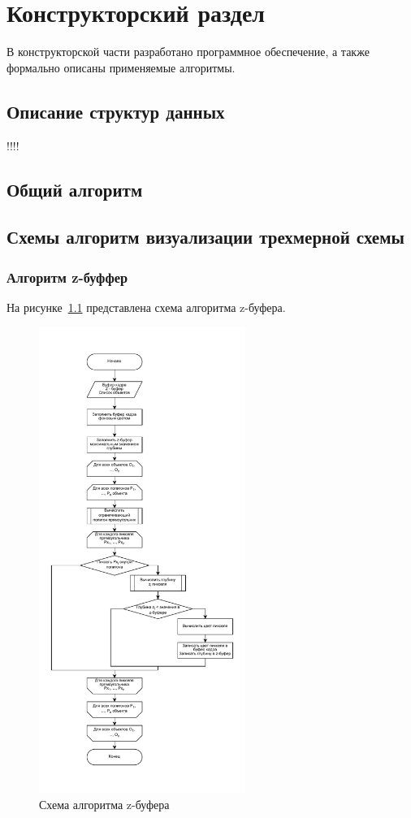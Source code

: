 \chapter{Конструкторский раздел}
В конструкторской части разработано программное обеспечение, а также формально описаны применяемые алгоритмы.

\section{Описание структур данных}
!!!!
\section{Общий алгоритм }
\section{Схемы алгоритм визуализации трехмерной схемы}
\subsection{Алгоритм z-буффер}
На рисунке~\ref{fig:z_buf} представлена схема алгоритма z-буфера.
\begin{figure}[H]
	\centering
	\includegraphics[width=0.6\textwidth, page=1]{assets/img/z-bufer.pdf}   
	\caption{Схема алгоритма z-буфера}
	\label{fig:z_buf}
\end{figure}

